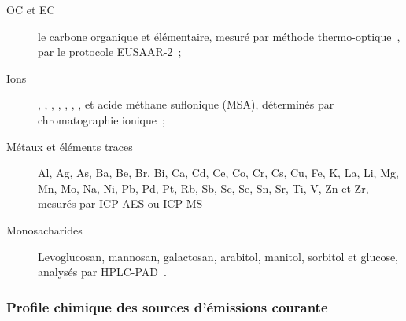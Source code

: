 \begin{description}
    \item[OC et EC] le carbone organique et élémentaire, mesuré par méthode
        thermo-optique~\autocite[Sunset Lab. Analyser]{birchElemental1996}, par le
        protocole EUSAAR-2~\autocite{cavalliStandardised2010,cenAmbient2017a};

    \item[Ions] , , , , , ,
        ,  et acide méthane suflonique (MSA), déterminés par
        chromatographie ionique~\autocite{jaffrezoSeasonal2005,cenAmbient2017b};

    \item[Métaux et éléments traces] Al, Ag, As, Ba, Be, Br, Bi, Ca, Cd, Ce, Co, Cr, Cs,
        Cu, Fe, K, La, Li, Mg, Mn, Mo, Na, Ni, Pb, Pd, Pt, Rb, Sb, Sc, Se, Sn, Sr, Ti, V,
        Zn et Zr, mesurés par ICP-AES ou
        ICP-MS~\autocite{allemanPM102010,mbengueSizedistributed2014,cenAmbient2005}

    \item[Monosacharides] Levoglucosan, mannosan, galactosan, arabitol, manitol, sorbitol
        et glucose, analysés par
        HPLC-PAD~\autocite{piotQuantification2012,wakedSource2014}.

\end{description}

\subsubsection{Profile chimique des sources d'émissions courante}%
\label{ssub:profile_chimique_des_sources_d_émissions_courante}

